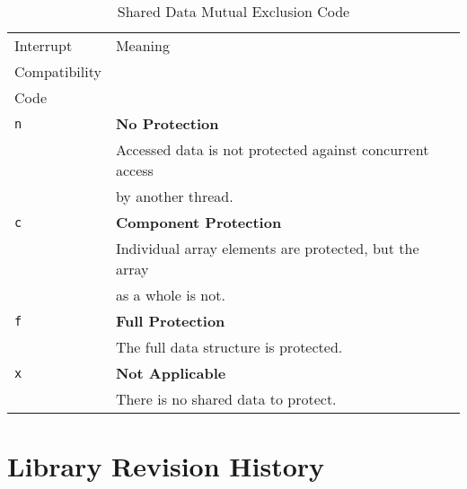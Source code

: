 \begin{table}
\caption{Shared Data Mutual Exclusion Code}
\label{tbl:ciov0:slcv0:sfnc0:02b}
\begin{center}
\begin{tabular}{|l|l|}
\hline
Interrupt     & Meaning                                                          \\
Compatibility &                                                                  \\
Code          &                                                                  \\
\hline
\hline
\texttt{n}    & \textbf{No Protection}                                           \\
              & Accessed data is not protected against concurrent access         \\
              & by another thread.                                               \\
\hline
\texttt{c}    & \textbf{Component Protection}                                    \\
              & Individual array elements are protected, but the array           \\
              & as a whole is not.                                               \\
\hline
\texttt{f}    & \textbf{Full Protection}                                         \\
              & The full data structure is protected.                            \\
\hline
\texttt{x}    & \textbf{Not Applicable}                                          \\
              & There is no shared data to protect.                              \\
\hline
\end{tabular}
\end{center}
\end{table}



\section{Library Revision History}
\label{ciov0:slrh0}

